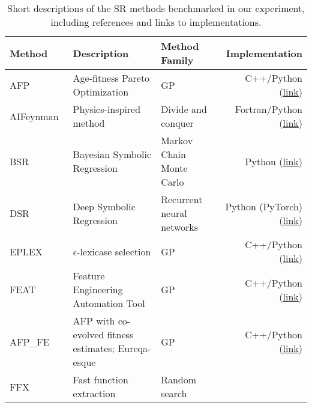 \begin{table}
    \footnotesize
    \center
    \caption{
        Short descriptions of the SR methods benchmarked in our experiment, including references and links to implementations. 
    }\label{tbl:methods}
    \begin{tabular}{l L{12em} L{8em} r}
        Method      &   Description                                         &   Method Family                       &   Implementation  \\ 
        \midrule
        AFP~\cite{schmidtAgefitnessParetoOptimization2011}               &   Age-fitness Pareto Optimization     &   GP
                    &   C++/Python (\href{https://github.com/EpistasisLab/ellyn}{link})                  \\
        AIFeynman~\cite{udrescuAIFeynmanParetooptimal2020}               &   Physics-inspired method             &   Divide and conquer
                    &   Fortran/Python (\href{https://github.com/SJ001/AI-Feynman}{link})              \\
        BSR~\cite{jinBayesianSymbolicRegression2020}                     &   Bayesian Symbolic Regression        &   Markov Chain Monte Carlo
                    &   Python (\href{https://github.com/ying531/MCMC-SymReg}{link})                      \\
        DSR~\cite{petersenDeepSymbolicRegression2020}                    &   Deep Symbolic Regression            &   Recurrent neural networks   
                    &   Python (PyTorch) (\href{https://github.com/brendenpetersen/deep-symbolic-regression}{link})            \\
        EPLEX~\cite{lacavaProbabilisticMultiobjectiveAnalysis2019}       &   $\epsilon$-lexicase selection       &   GP
                    &   C++/Python (\href{https://github.com/EpistasisLab/ellyn}{link})                  \\
        FEAT~\cite{lacavaLearningConciseRepresentations2019c}        &   Feature Engineering Automation Tool &   GP                          
                    &   C++/Python (\href{https://github.com/lacava/feat}{link})                  \\
        AFP\_FE~\cite{schmidtDistillingFreeformNatural2009b}               &   AFP with co-evolved fitness estimates; Eureqa-esque     &   GP
                    &   C++/Python (\href{https://github.com/EpistasisLab/ellyn}{link})                  \\
        FFX~\cite{mcconaghyFFXFastScalable2011}         &   Fast function extraction             &   Random search               

\end{tabular}
\end{table}
